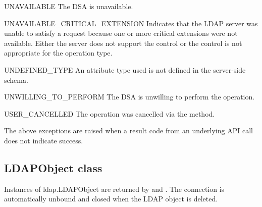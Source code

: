 \begin{excdesc}{UNAVAILABLE}
The DSA is unavailable.
\end{excdesc}
\begin{excdesc}{UNAVAILABLE_CRITICAL_EXTENSION}
Indicates that the LDAP server was unable to satisfy a request
because one or more critical extensions were not available. Either
the server does not support the control or the control is not appropriate
for the operation type.
\end{excdesc}
\begin{excdesc}{UNDEFINED_TYPE}
An attribute type used is not defined in the server-side schema.
\end{excdesc}
\begin{excdesc}{UNWILLING_TO_PERFORM}
The  DSA  is  unwilling to perform the operation.
\end{excdesc}
\begin{excdesc}{USER_CANCELLED}
The operation was cancelled via the  method.
\end{excdesc}

The above exceptions are raised when a result code from an underlying API
call does not indicate success.

%

\subsection{LDAPObject class \label{ldap-objects}}


Instances of ldap.LDAPObject are returned by 
and . The connection is automatically unbound and closed 
when the LDAP object is deleted.

